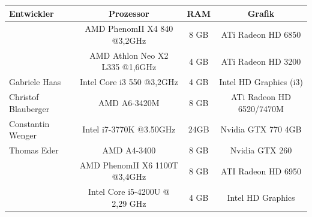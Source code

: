 \documentclass[10pt]{scrreprt}
\begin{document}
\begin{tabular}{|l|c|c|c|}
\hline
\rule[-1ex]{0pt}{4ex}\textsf{\textbf{Entwickler}} & \textsf{\textbf{Prozessor}} & \textsf{\textbf{RAM}} & \textsf{\textbf{Grafik}} \\
\hline
\hline
\rule[-1ex]{0pt}{4ex}\multirow{2}{*}{Fabian Knorr} & AMD PhenomII X4 840 @3,2GHz & 8 GB & ATi Radeon HD 6850 \\
\rule[-1ex]{0pt}{2ex} & AMD Athlon Neo X2 L335 @1,6GHz & 4 GB & ATi Radeon HD 3200 \\
\hline
\rule[-1ex]{0pt}{4ex}Gabriele Haas & Intel Core i3 550 @3,2GHz & 4 GB & Intel HD Graphics (i3) \\
\hline
\rule[-1ex]{0pt}{4ex}Christof Blauberger & AMD A6-3420M & 8 GB & ATi Radeon HD 6520/7470M \\
\hline
\rule[-1ex]{0pt}{4ex}Constantin Wenger & Intel i7-3770K @3.50GHz & 24GB & Nvidia GTX 770 4GB \\
\hline
\rule[-1ex]{0pt}{4ex}Thomas Eder & AMD A4-3400 & 8 GB & Nvidia GTX 260 \\
\hline
\rule[-1ex]{0pt}{4ex}\multirow{2}{*}{Sebastian Reichl} & AMD PhenomII X6 1100T @3,4GHz & 8 GB & ATI Radeon HD 6950 \\
\rule[-1ex]{0pt}{2ex}& Intel Core i5-4200U @ 2,29 GHz & 4 GB & Intel HD Graphics \\
\hline
\end{tabular}
\end{document}
